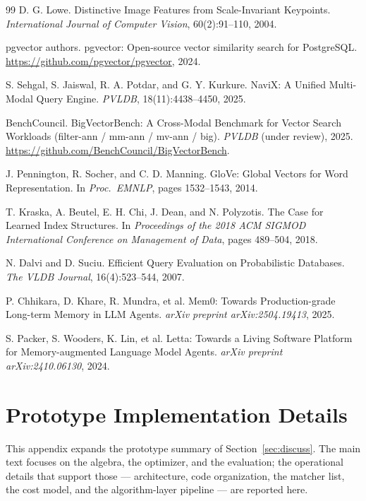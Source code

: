 \documentclass[sigconf,nonacm,review]{acmart}
\theoremstyle{plain}
\theoremstyle{definition}
\theoremstyle{remark}
\begin{document}
\begin{thebibliography}{99}
 D. G. Lowe.
  Distinctive Image Features from Scale-Invariant Keypoints.
  \emph{International Journal of Computer Vision}, 60(2):91--110, 2004.

 pgvector authors.
  pgvector: Open-source vector similarity search for PostgreSQL.
  \url{https://github.com/pgvector/pgvector}, 2024.

 S. Sehgal, S. Jaiswal, R. A. Potdar, and
  G. Y. Kurkure.
  NaviX: A Unified Multi-Modal Query Engine.
  \emph{PVLDB}, 18(11):4438--4450, 2025.

 BenchCouncil.
  BigVectorBench: A Cross-Modal Benchmark for Vector Search
  Workloads (filter-ann / mm-ann / mv-ann / big).
  \emph{PVLDB} (under review), 2025.
  \url{https://github.com/BenchCouncil/BigVectorBench}.

 J. Pennington, R. Socher, and C. D. Manning.
  GloVe: Global Vectors for Word Representation.
  In \emph{Proc.\ EMNLP}, pages 1532--1543, 2014.

 T. Kraska, A. Beutel, E. H. Chi, J. Dean, and
  N. Polyzotis.
  The Case for Learned Index Structures.
  In \emph{Proceedings of the 2018 ACM SIGMOD International
  Conference on Management of Data}, pages 489--504, 2018.

 N. Dalvi and D. Suciu.
  Efficient Query Evaluation on Probabilistic Databases.
  \emph{The VLDB Journal}, 16(4):523--544, 2007.

 P. Chhikara, D. Khare, R. Mundra, et al.
  Mem0: Towards Production-grade Long-term Memory in LLM Agents.
  \emph{arXiv preprint arXiv:2504.19413}, 2025.

 S. Packer, S. Wooders, K. Lin, et al.
  Letta: Towards a Living Software Platform for Memory-augmented
  Language Model Agents.
  \emph{arXiv preprint arXiv:2410.06130}, 2024.
\end{thebibliography}

\appendix
\section{Prototype Implementation Details}\label{app:proto}

This appendix expands the prototype summary of
Section~\ref{sec:discuss}. The main text focuses on the algebra,
the optimizer, and the evaluation; the operational details that
support those --- architecture, code organization, the
matcher list, the cost model, and the algorithm-layer pipeline
--- are reported here.
\end{document}
